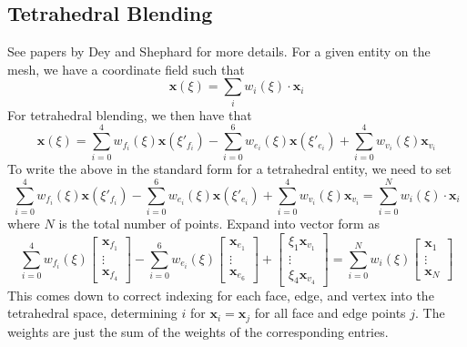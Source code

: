 \documentclass{article}
\begin{document}
\subsection{Tetrahedral Blending}
See papers by Dey and Shephard for more details. For a given entity on the mesh, we have a coordinate field such that 
\[ \mathbf{x}(\xi) = \sum_i w_i(\xi) \cdot \mathbf{x}_i \]
For tetrahedral blending, we then have that
\[\mathbf{x}(\xi) = \sum_{i=0}^{4}w_{f_i}(\xi)\mathbf{x}(\xi'_{f_i}) - \sum_{i=0}^{6}w_{e_i}(\xi)\mathbf{x}(\xi'_{e_i}) + \sum_{i=0}^{4}w_{v_i}(\xi)\mathbf{x}_{v_i}\]
To write the above in the standard form for a tetrahedral entity, we need to set 
\[ \sum_{i=0}^{4}w_{f_i}(\xi)\mathbf{x}(\xi'_{f_i}) - \sum_{i=0}^{6}w_{e_i}(\xi)\mathbf{x}(\xi'_{e_i}) + \sum_{i=0}^{4}w_{v_i}(\xi)\mathbf{x}_{v_i} = \sum_{i=0}^N w_i(\xi) \cdot \mathbf{x}_i \]
where $N$ is the total number of points.  Expand into vector form as 
\[ \sum_{i=0}^{4}w_{f_i}(\xi)\left[ \begin{array}{c}\mathbf{x}_{f_1} \\ \vdots \\ \mathbf{x}_{f_{4}} \end{array}\right] - \sum_{i=0}^{6}w_{e_i}(\xi)\left[ \begin{array}{c}\mathbf{x}_{e_1} \\ \vdots \\ \mathbf{x}_{e_{6}} \end{array}\right] + \left[ \begin{array}{c}\xi_1\mathbf{x}_{v_1} \\ \vdots \\ \xi_4\mathbf{x}_{v_4} \end{array}\right]  = \sum_{i=0}^{N}w_i(\xi)\left[ \begin{array}{c}\mathbf{x}_{1} \\ \vdots \\ \mathbf{x}_{N} \end{array}\right] \]
This comes down to correct indexing for each face, edge, and vertex into the tetrahedral space, determining $i$ for $\mathbf{x}_i = \mathbf{x}_{j}$ for all face and edge points $j$. The weights are just the sum of the weights of the corresponding entries.
\end{document}

